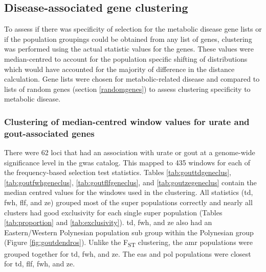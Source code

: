 \documentclass[twoside,openright]{report}
\begin{document}
\subsection{Disease-associated gene clustering}\label{genelistcluster}

To assess if there was specificity of selection for the metabolic
disease gene lists or if the population groupings could be obtained from
any list of genes, clustering was performed using the actual statistic
values for the genes. These values were median-centred to account for
the population specific shifting of distributions which would have
accounted for the majority of difference in the distance calculation.
Gene lists were chosen for metabolic-related disease and compared to
lists of random genes (section \ref{randomgenes}) to assess clustering
specificity to metabolic disease.

\subsubsection{Clustering of median-centred window values for urate and
gout-associated
genes}\label{clustering-of-median-centred-window-values-for-urate-and-gout-associated-genes}

There were 62 loci that had an association with urate or gout at a
genome-wide significance level in the \gls{gwas} catalog. This mapped to
435 windows for each of the frequency-based selection test statistics.
Tables \ref{tab:gouttdgeneclus}, \ref{tab:goutfwhgeneclus},
\ref{tab:goutflfgeneclus}, and \ref{tab:goutzegeneclus} contain the
median centred values for the windows used in the clustering. All
statistics (\gls{td}, \gls{fwh}, \gls{flf}, and \gls{ze}) grouped most
of the super populations correctly and nearly all clusters had good
exclusivity for each single super population (Tables
\ref{tab:proportion} and \ref{tab:exclusivity}). \Gls{td}, \gls{fwh},
and \gls{ze} also had an Eastern/Western Polynesian population sub group
within the Polynesian group (Figure \ref{fig:goutdendros}). Unlike the
F\textsubscript{ST} clustering, the \gls{amr} populations were grouped
together for \gls{td}, \gls{fwh}, and \gls{ze}. The \gls{eas} and
\gls{pol} populations were closest for \gls{td}, \gls{flf}, \gls{fwh},
and \gls{ze}.
\end{document}
